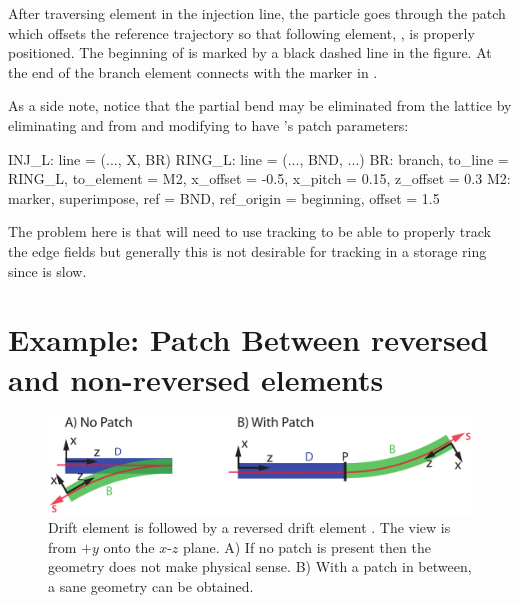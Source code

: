 After traversing element  in the injection line, the particle
goes through the patch  which offsets the reference trajectory
so that following element, , is properly positioned.  The
beginning of  is marked by a black dashed line in the figure.
At the end of  the branch element  connects 
with the marker  in .

As a side note, notice that the partial bend  may be
eliminated from the lattice by eliminating  and  from
 and modifying  to have 's patch parameters:
\begin{example}
  INJ_L: line = (..., X, BR)
  RING_L: line = (..., BND, ...)
  BR: branch, to_line = RING_L, to_element = M2,
          x_offset = -0.5, x_pitch = 0.15, z_offset = 0.3
  M2: marker, superimpose, ref = BND, ref_origin = beginning, offset = 1.5
\end{example}
The problem here is that  will need to use 
tracking to be able to properly track the edge fields but generally
this is not desirable for tracking in a storage ring since
 is slow.

\section{Example: Patch Between reversed and non-reversed elements}
\label{s:ex.patch}

\begin{figure}[tb]
  \centering
  \includegraphics[width=5in]{patch-between.pdf}
  \caption[Patching between reversed and non-reversed elements.]{
Drift element  is followed by a reversed drift element .
The view is from $+y$ onto the $x$-$z$ plane. A) If no patch is
present then the geometry does not make physical sense. B) With a
patch in between, a sane geometry can be obtained.}
  \label{f:patch.between}
\end{figure}

